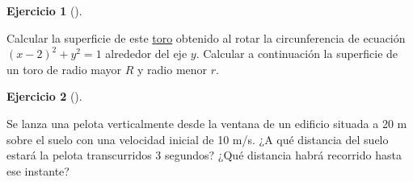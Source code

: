 \documentclass[
  a4paper,
]{scrreport}
\theoremstyle{definition}
\newtheorem{exercise}{Ejercicio}[chapter]
\theoremstyle{remark}
\begin{document}
\begin{exercise}[]\protect\hypertarget{exr-superficie-toro}{}\label{exr-superficie-toro}

Calcular la superficie de este
\href{https://www.geogebra.org/m/wy2uquqc}{toro} obtenido al rotar la
circunferencia de ecuación \((x-2)^2+y^2=1\) alrededor del eje \(y\).
Calcular a continuación la superficie de un toro de radio mayor \(R\) y
radio menor \(r\).

\end{exercise}

\begin{exercise}[]\protect\hypertarget{exr-cinematica-1}{}\label{exr-cinematica-1}

Se lanza una pelota verticalmente desde la ventana de un edificio
situada a 20 m sobre el suelo con una velocidad inicial de 10 m/s. ¿A
qué distancia del suelo estará la pelota transcurridos 3 segundos? ¿Qué
distancia habrá recorrido hasta ese instante?

\end{exercise}
\end{document}
